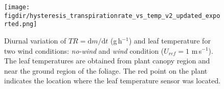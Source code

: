 	\begin{figure}[t]
	\centering
	\texttt{[image: \\figdir/hysteresis\_transpirationrate\_vs\_temp\_v2\_updated\_exported.png]}
	\caption{Diurnal variation of $TR=\mathrm{d}m/\mathrm{d}t$ (g\,h$^{-1}$) and leaf temperature for two wind conditions:   \textit{no-wind} and   \textit{wind} condition ($U_{ref}=1$ m\,s$^{-1}$).  The leaf temperatures are obtained from  plant canopy region and  near the ground region of the foliage. The red point on the plant indicates the location where the leaf temperature sensor was located.}
	\label{fig:hysteresis_transpirationrate_vs_temp_v2}
	\end{figure}

